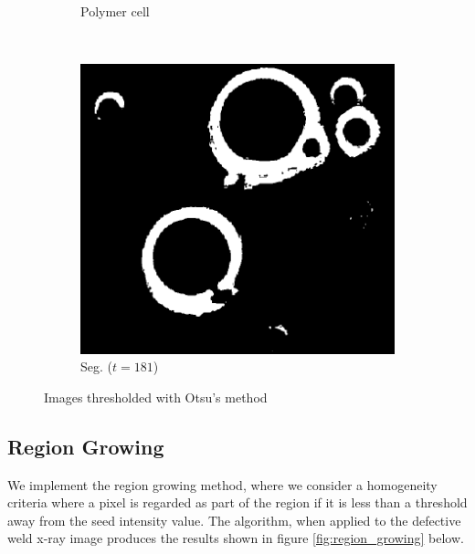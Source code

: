 \documentclass[]{article}
\begin{document}
\begin{figure}[H]
\begin{subfigure}{0.25\textwidth}
        \caption{Polymer cell}
    \end{subfigure}%
    ~
    \begin{subfigure}{0.25\textwidth}
        \centering
        \includegraphics[width=\textwidth]{img/polymercell-segmented}
        \caption{Seg. ($t=181$)}
    \end{subfigure}
    \caption{Images thresholded with Otsu's method}
    \label{fig:otsu}
\end{figure}

\subsection{Region Growing}
We implement the region growing method, where we consider a homogeneity criteria where a pixel is regarded as part of the region if it is less than a threshold away from the seed intensity value. The algorithm, when applied to the defective weld x-ray image produces the results shown in figure \ref{fig:region_growing} below.
\end{document}
